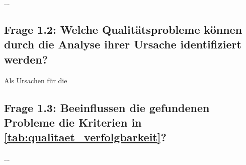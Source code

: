 
...

\subsection{Frage 1.2: Welche Qualitätsprobleme können durch die Analyse ihrer Ursache identifiziert werden?}

Als Ursachen für die 

\subsection{Frage 1.3: Beeinflussen die gefundenen Probleme die Kriterien in \ref{tab:qualitaet_verfolgbarkeit}?}
...

